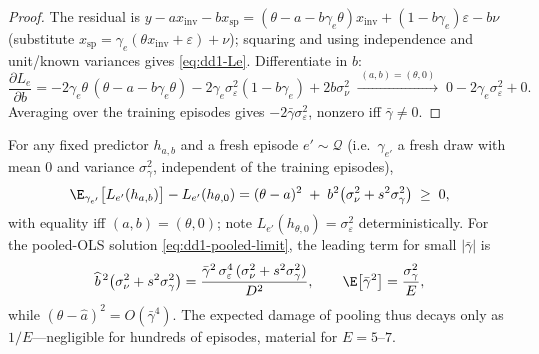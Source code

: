 \begin{proof}
The residual is $y - a x_{\mathrm{inv}} - b x_{\mathrm{sp}}
= (\theta - a - b\gamma_e \theta) x_{\mathrm{inv}} + (1 - b\gamma_e)
\varepsilon - b \nu$ (substitute $x_{\mathrm{sp}} = \gamma_e(\theta
x_{\mathrm{inv}} + \varepsilon) + \nu$); squaring and using independence and
unit/known variances gives \eqref{eq:dd1-Le}. Differentiate in $b$:
\[
\frac{\partial L_e}{\partial b}
= -2\gamma_e\theta\,(\theta - a - b\gamma_e\theta)
- 2\gamma_e \sigma_\varepsilon^2 (1 - b\gamma_e) + 2 b \sigma_\nu^2
\;\xrightarrow{\;(a,b) = (\theta, 0)\;}\;
0 - 2\gamma_e \sigma_\varepsilon^2 + 0 .
\]
Averaging over the training episodes gives $-2\bar\gamma
\sigma_\varepsilon^2$, nonzero iff $\bar\gamma \neq 0$.
\end{proof}

\begin{proposition}
\label{prop:dd1-excess}
For any fixed predictor $h_{a,b}$ and a fresh episode $e' \sim \mathcal{Q}$
(i.e.\ $\gamma_{e'}$ a fresh draw with mean $0$ and variance
$\sigma_\gamma^2$, independent of the training episodes),
\begin{equation}
\label{eq:dd1-excess}
\E_{\gamma_{e'}}\bigl[ L_{e'}(h_{a,b}) \bigr] - L_{e'}(h_{\theta, 0})
= (\theta - a)^2 \;+\; b^2 \bigl( \sigma_\nu^2 + s^2 \sigma_\gamma^2 \bigr)
\;\ge\; 0,
\end{equation}
with equality iff $(a,b) = (\theta, 0)$; note $L_{e'}(h_{\theta,0}) =
\sigma_\varepsilon^2$ deterministically. For the pooled-OLS solution
\eqref{eq:dd1-pooled-limit}, the leading term for small $|\bar\gamma|$ is
\begin{equation}
\label{eq:dd1-excess-rate}
\widehat{b}^{\,2}\bigl( \sigma_\nu^2 + s^2\sigma_\gamma^2 \bigr)
= \frac{\bar{\gamma}^2\, \sigma_\varepsilon^4 \,(\sigma_\nu^2 +
s^2\sigma_\gamma^2)}{D^2},
\qquad
\E\bigl[\bar{\gamma}^2\bigr] = \frac{\sigma_\gamma^2}{E},
\end{equation}
while $(\theta - \widehat a)^2 = O(\bar\gamma^4)$. The expected damage of
pooling thus decays only as $1/E$---negligible for hundreds of episodes,
material for $E = 5$--$7$.
\end{proposition}


